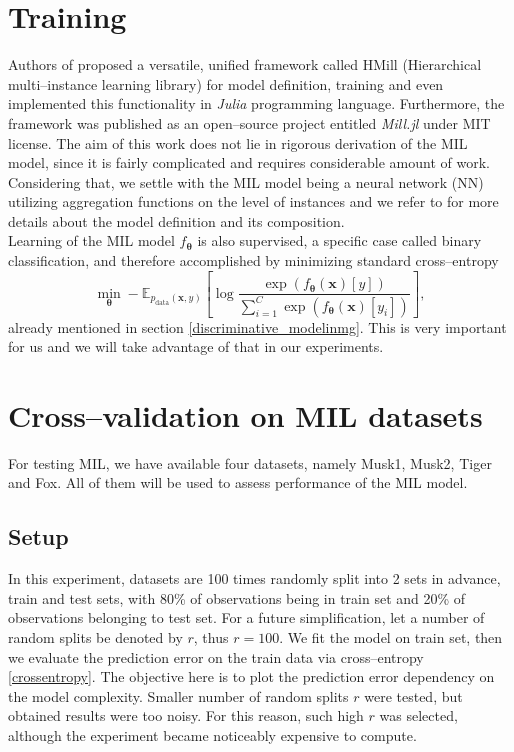 \section{Training}\label{MILtraining}
Authors of \cite{mandlik} proposed a versatile, unified framework called HMill (Hierarchical multi--instance learning library) for model definition, training and even implemented this functionality in \emph{Julia} programming language. Furthermore, the framework was published as an open--source project entitled \emph{Mill.jl} under MIT license. The aim of this work does not lie in rigorous derivation of the MIL model, since it is fairly complicated and requires considerable amount of work. Considering that, we settle with the MIL model being a neural network (NN) utilizing aggregation functions on the level of instances and we refer to \cite{mandlik} for more details about the model definition and its composition.   \\
Learning of the MIL model $f_{\boldsymbol{\theta}}$ is also supervised, a specific case called binary classification, and therefore accomplished by minimizing standard cross--entropy 
\begin{equation}\label{crossentropy52}
	\min_{\boldsymbol{\theta}}- \mathbb{E}_{p_{\mathrm{data}}(\boldsymbol{x},y) }\left[\log \frac{\exp\left({f_{\boldsymbol{\theta}}\left(\boldsymbol{x}\right)[y]}\right)}{\sum_{i=1}^C\exp\left({f_{\boldsymbol{\theta}}\left(\boldsymbol{x}\right)[y_i]}\right)} \right],
\end{equation}   
already mentioned in section \ref{discriminative_modelinmg}. This is very important for us and we will take advantage of that in our experiments.
 
\section{Cross--validation on MIL datasets}\label{experimentCV}
For testing MIL, we have available four datasets, namely Musk1, Musk2, Tiger and Fox. All of them will be used to assess performance of the MIL model.
\subsection{Setup}
In this experiment, datasets are 100 times randomly split into 2 sets in advance, train and test sets, with 80\% of observations being in train set and 20\% of observations belonging to test set. For a future simplification, let a number of random splits be denoted by $r$, thus $r=100$.  We fit the model on train set, then we evaluate the prediction error on the train data via cross--entropy \ref{crossentropy}. The objective here is to plot the prediction error dependency on the model complexity. Smaller number of random splits $r$ were tested, but obtained results were too noisy. For this reason, such high $r$ was selected, although the experiment became noticeably expensive to compute.    \\

